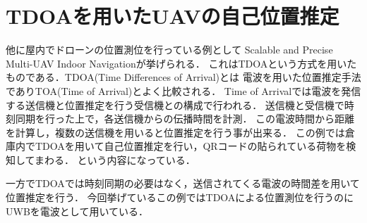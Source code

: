 \section{TDOAを用いたUAVの自己位置推定}
他に屋内でドローンの位置測位を行っている例として
Scalable and Precise Multi-UAV Indoor Navigation\cite{TDOA-UWB}が挙げられる．
これはTDOAという方式を用いたものである．TDOA(Time Differences of Arrival)とは
電波を用いた位置推定手法でありTOA(Time of Arrival)とよく比較される．
Time of Arrivalでは電波を発信する送信機と位置推定を行う受信機との構成で行われる．
送信機と受信機で時刻同期を行った上で，各送信機からの伝播時間を計測．
この電波時間から距離を計算し，複数の送信機を用いると位置推定を行う事が出来る．
この例では倉庫内でTDOAを用いて自己位置推定を行い，QRコードの貼られている荷物を検知してまわる．
という内容になっている．

一方でTDOAでは時刻同期の必要はなく，送信されてくる電波の時間差を用いて位置推定を行う．
今回挙げているこの例ではTDOAによる位置測位を行うのにUWBを電波として用いている．



